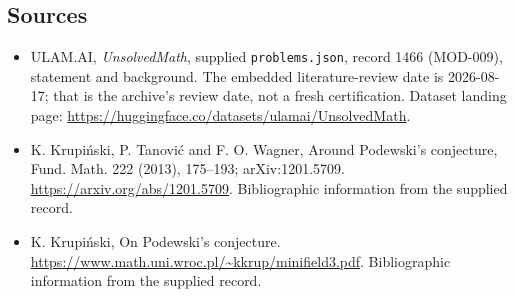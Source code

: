 \documentclass[11pt,a4paper]{article}
\begin{document}
\subsection{Sources}

{\small

\begin{itemize}

\item[\hypertarget{source:1466:1}{S1}] ULAM.AI, \emph{UnsolvedMath}, supplied \texttt{problems.json}, record 1466 (MOD-009), statement and background. The embedded literature-review date is 2026-08-17; that is the archive’s review date, not a fresh certification. Dataset landing page: \url{https://huggingface.co/datasets/ulamai/UnsolvedMath}.

\item[\hypertarget{source:1466:2}{S2}] K. Krupiński, P. Tanović and F. O. Wagner, Around Podewski's conjecture, Fund. Math. 222 (2013), 175--193; arXiv:1201.5709. \url{https://arxiv.org/abs/1201.5709}. Bibliographic information from the supplied record.

\item[\hypertarget{source:1466:3}{S3}] K. Krupiński, On Podewski's conjecture. \url{https://www.math.uni.wroc.pl/~kkrup/minifield3.pdf}. Bibliographic information from the supplied record.

\end{itemize}

}

\label{end:1466}
\end{document}
